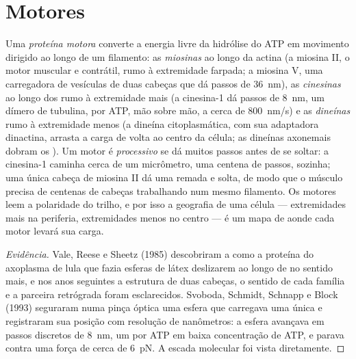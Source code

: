 \section{Motores}

\begin{definition}\label{def:b3:cytoskeleton-motility:motors}
Uma \emph{proteína motora} converte a energia livre da hidrólise do ATP
em movimento dirigido ao longo de um filamento: as \emph{miosinas} ao
longo da actina (a miosina II, o motor muscular e contrátil, rumo à
extremidade farpada; a miosina V, uma carregadora de vesículas de duas
cabeças que dá passos de \qty{36}{nm}), as \emph{cinesinas} ao longo
dos  rumo à extremidade mais (a cinesina-1 dá passos de
\qty{8}{nm}, um dímero de tubulina, por ATP, mão sobre mão, a cerca de
\qty{800}{nm/s}) e as \emph{dineínas} rumo à extremidade menos (a
dineína citoplasmática, com sua adaptadora dinactina, arrasta a carga
de volta ao centro da célula; as dineínas axonemais dobram os ).
Um motor é \emph{processivo} se dá muitos passos antes de se soltar: a
cinesina-1 caminha cerca de um micrômetro, uma centena de passos,
sozinha; uma única cabeça de miosina II dá uma remada e solta, de modo
que o músculo precisa de centenas de cabeças trabalhando num mesmo
filamento. Os motores leem a polaridade do trilho, e por isso a
geografia de uma célula --- extremidades mais na periferia,
extremidades menos no centro --- é um mapa de aonde cada motor levará
sua carga.
\end{definition}

\begin{proof}[Evidência]
Vale, Reese e Sheetz (1985) descobriram a  como a proteína do
axoplasma de lula que fazia esferas de látex deslizarem ao longo de
 no sentido mais, e nos anos seguintes a estrutura de duas
cabeças, o sentido de cada família e a parceira retrógrada 
foram esclarecidos. Svoboda, Schmidt, Schnapp e Block (1993) seguraram
numa pinça óptica uma esfera que carregava uma única  e
registraram sua posição com resolução de nanômetros: a esfera avançava
em passos discretos de \qty{8}{nm}, um por ATP em baixa concentração de
ATP, e parava contra uma força de cerca de \qty{6}{pN}. A escada
molecular foi vista diretamente.
\end{proof}

